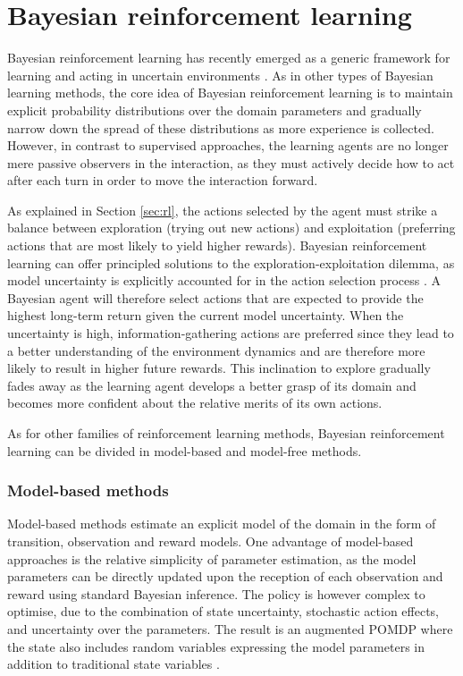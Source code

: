 \section{Bayesian reinforcement learning}
\label{sec:brl}

Bayesian reinforcement learning has recently emerged as a generic framework for learning and acting in uncertain environments \citep{poupart2008,Ross:2011,brl2012}. As in other types of Bayesian learning methods, the core idea of Bayesian reinforcement learning is to maintain explicit probability distributions over the domain parameters and gradually narrow down the spread of these distributions as more experience is collected. However, in contrast to supervised approaches, the learning agents are no longer mere passive observers in the interaction, as they must actively decide how to act after each turn in order to move the interaction forward. 

As explained in Section \ref{sec:rl}, the actions selected by the agent must strike a balance between exploration (trying out new actions) and exploitation (preferring actions that are most likely to yield higher rewards). Bayesian reinforcement learning can offer principled solutions to the exploration-exploitation dilemma, as model uncertainty is explicitly accounted for in the action selection process \citep{Duff:2002,Ross:2011}.  A Bayesian agent will therefore select actions that are expected to provide the highest long-term return given the current model uncertainty. When the uncertainty is high, information-gathering actions are preferred since they lead to a better understanding of the environment dynamics and are therefore more likely to result in higher future rewards. This inclination to explore gradually fades away as the learning agent develops a better grasp of its domain and becomes more confident about the relative merits of its own actions.

As for other families of reinforcement learning methods, Bayesian reinforcement learning can be divided in model-based and model-free methods. 


\subsubsection*{Model-based methods}

Model-based methods estimate an explicit model of the domain in the form of transition, observation and reward models.  One advantage of model-based approaches is the relative simplicity of parameter estimation, as the model parameters can be directly updated upon the reception of each observation and reward using standard Bayesian inference. The policy is however complex to optimise, due to the combination of state uncertainty, stochastic action effects, and uncertainty over the parameters. The result is an augmented POMDP where the state also includes random variables expressing the model parameters in addition to traditional state variables \citep{Duff:2002,Ross:2011}. 

